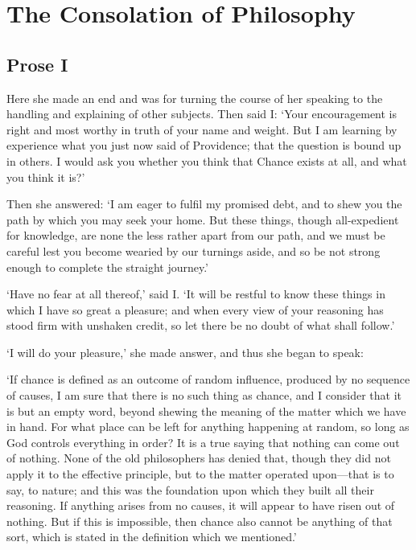 
\author{Boethius}
\chapter[The Consolation of Philosophy, bk. 5]{The Consolation of
Philosophy}

\section{Prose I}

Here she made an end and was for turning the course of her speaking to
the handling and explaining of other subjects. Then said I: `Your
encouragement is right and most worthy in truth of your name and
weight. But I am learning by experience what you just now said of
Providence; that the question is bound up in others. I would ask you
whether you think that Chance exists at all, and what you think it
is?'

Then she answered: `I am eager to fulfil my promised debt, and to shew
you the path by which you may seek your home. But these things, though
all-expedient for knowledge, are none the less rather apart from our
path, and we must be careful lest you become wearied by our turnings
aside, and so be not strong enough to complete the straight journey.'

`Have no fear at all thereof,' said I. `It will be restful to know
these things in which I have so great a pleasure; and when every view
of your reasoning has stood firm with unshaken credit, so let there be
no doubt of what shall follow.'

`I will do your pleasure,' she made answer, and thus she began to
speak:

`If chance is defined as an outcome of random influence,
produced by no sequence of causes, I am sure that there is no such
thing as chance, and I consider that it is but an empty word, beyond
shewing the meaning of the matter which we have in hand. For what
place can be left for anything happening at random, so long as God
controls everything in order? It is a true saying that nothing can
come out of nothing. None of the old philosophers has denied that,
though they did not apply it to the effective principle, but to the
matter operated upon---that is to say, to nature; and this was the
foundation upon which they built all their reasoning. If anything
arises from no causes, it will appear to have risen out of nothing.
But if this is impossible, then chance also cannot be anything of
that sort, which is stated in the definition which we mentioned.'

